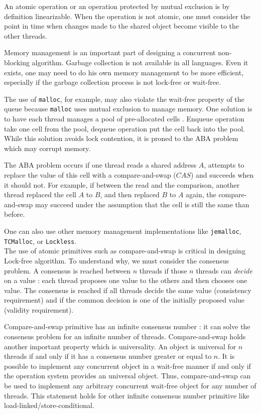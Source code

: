 An atomic operation or an operation protected by mutual exclusion is by
definition linearizable. When the operation is not atomic, one must consider the
point in time when changes made to the shared object become visible to the other
threads.

 Memory management is an important part of designing a
concurrent non-blocking algorithm. Garbage collection is not available in all
languages. Even it exists, one may need to do his own memory management to
be more efficient, especially if the garbage collection process is not lock-free
or wait-free.

The use of \texttt{malloc}, for example, may also violate the wait-free property
of the queue because \texttt{malloc} uses mutual exclusion to manage memory. One
solution is to have each thread manages a pool of pre-allocated cells
\cite{Herlihy08}. Enqueue operation take one cell from the pool, dequeue
operation put the cell back into the pool. While this solution avoids lock
contention, it is proned to the ABA problem which may corrupt memory.

The ABA problem occurs if one thread reads a shared address $A$, attempts to
replace the value of this cell with a compare-and-swap ($CAS$) and succeeds when
it should not. For example, if between the read and the comparison, another
thread replaced the cell $A$ to $B$, and then replaced $B$ to $A$ again, the
compare-and-swap may succeed under the assumption that the cell is still the
same than before.

One can also use other memory management implementations like \texttt{jemalloc},
\texttt{TCMalloc}, or \texttt{Lockless}. \\

 The use of atomic primitives such as compare-and-swap is
critical in designing Lock-free algorithm. To understand why, we must consider
the consensus problem. A consensus is reached between $n$ threads if those $n$
threads can \textit{decide} on a value : each thread proposes one value to the
others and then chooses one value. The consensus is reached if all threads
decide the same value (consistency requirement) and if the common decision is
one of the initially proposed value (validity requirement).

Compare-and-swap primitive has an infinite consensus number
\cite{Herlihy:1991:WS:114005.102808} : it can solve the consensus problem for an
infinite number of threads. Compare-and-swap holds another important property
which is universality. An object is universal for $n$ threads if and only if it
has a consensus number greater or equal to $n$. It is possible to implement any
concurrent object in a wait-free manner if and only if the operation system
provides an universal object. Thus, compare-and-swap can be used to implement
any arbitrary concurrent wait-free object for any number of threads. This
statement holds for other infinite consensus number primitive like
load-linked/store-conditional. \\

